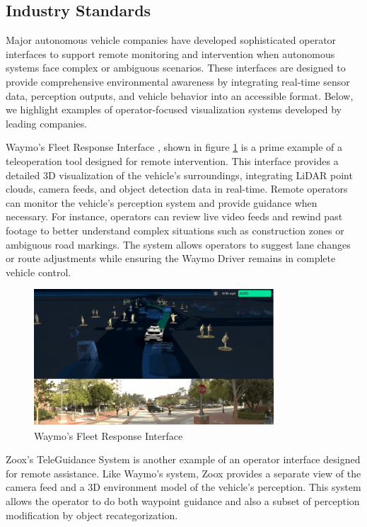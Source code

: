 \subsection{Industry Standards}
Major autonomous vehicle companies have developed sophisticated operator interfaces to support remote monitoring and intervention when autonomous systems face complex or ambiguous scenarios. These interfaces are designed to provide comprehensive environmental awareness by integrating real-time sensor data, perception outputs,
and vehicle behavior into an accessible format. Below, we highlight examples of operator-focused visualization systems developed by leading companies.

Waymo's Fleet Response Interface \cite{waymo2024fleetresponse}, shown in figure \ref{fig:Waymo} is a prime example of a teleoperation tool designed for remote intervention. This interface provides a detailed 3D visualization of the vehicle’s surroundings, integrating LiDAR point clouds, camera feeds, and object detection data in real-time. Remote operators can monitor the vehicle’s perception system and provide guidance when necessary. For instance, operators can review live video feeds and rewind past footage to better understand complex situations such as construction zones or ambiguous road markings. The system allows operators to suggest lane changes or route adjustments while ensuring the Waymo Driver remains in complete vehicle control.

\begin{figure}
    \includegraphics[width=0.8\textwidth]{figures/waymo.png}
    \centering
    \caption{Waymo's Fleet Response Interface \cite{waymo2024fleetresponse}}
    \label{fig:Waymo}
\end{figure}

Zoox's TeleGuidance System \cite{zoox2024teleguidance} is another example of an operator interface designed for remote assistance. Like Waymo’s system, Zoox provides a separate view of the camera feed and a 3D environment model of the vehicle’s perception. This system allows the operator to do both waypoint guidance
 \cite{corridor} and also a subset of perception modification \cite{feiler2023perception} by object recategorization.

